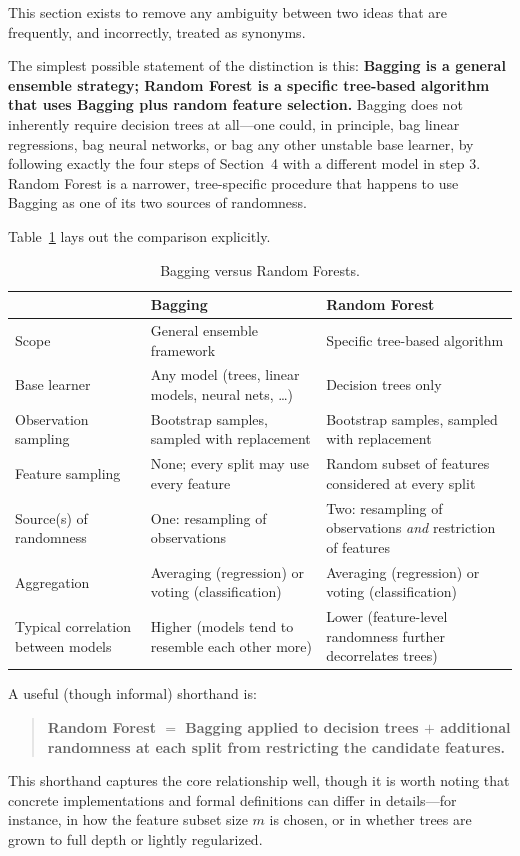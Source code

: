 \documentclass[12pt,a4paper]{article}
\begin{document}
This section exists to remove any ambiguity between two ideas that are frequently, and incorrectly, treated as synonyms.

The simplest possible statement of the distinction is this: \textbf{Bagging is a general ensemble strategy; Random Forest is a specific tree-based algorithm that uses Bagging plus random feature selection.} Bagging does not inherently require decision trees at all---one could, in principle, bag linear regressions, bag neural networks, or bag any other unstable base learner, by following exactly the four steps of Section~4 with a different model in step 3. Random Forest is a narrower, tree-specific procedure that happens to use Bagging as one of its two sources of randomness.

Table~\ref{tab:bagging-vs-rf} lays out the comparison explicitly.

\begin{table}[h]
\centering
\caption{Bagging versus Random Forests.}
\label{tab:bagging-vs-rf}
\begin{tabular}{@{}p{}p{}p{}@{}}
\toprule
& \textbf{Bagging} & \textbf{Random Forest} \\
\midrule
Scope & General ensemble framework & Specific tree-based algorithm \\
Base learner & Any model (trees, linear models, neural nets, \ldots) & Decision trees only \\
Observation sampling & Bootstrap samples, sampled with replacement & Bootstrap samples, sampled with replacement \\
Feature sampling & None; every split may use every feature & Random subset of features considered at every split \\
Source(s) of randomness & One: resampling of observations & Two: resampling of observations \emph{and} restriction of features \\
Aggregation & Averaging (regression) or voting (classification) & Averaging (regression) or voting (classification) \\
Typical correlation between models & Higher (models tend to resemble each other more) & Lower (feature-level randomness further decorrelates trees) \\
\bottomrule
\end{tabular}
\end{table}

A useful (though informal) shorthand is:
\begin{quote}
\textbf{Random Forest $=$ Bagging applied to decision trees $+$ additional randomness at each split from restricting the candidate features.}
\end{quote}
This shorthand captures the core relationship well, though it is worth noting that concrete implementations and formal definitions can differ in details---for instance, in how the feature subset size $m$ is chosen, or in whether trees are grown to full depth or lightly regularized.
\end{document}
